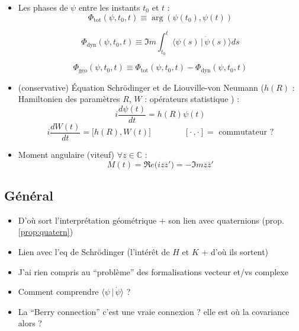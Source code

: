 \documentclass[hidelinks, french, oneside]{article}
\newcommand{\C}{\mathbb{C}}
\newcommand{\phaset}{\Phi_{\text{tot}}}
\newcommand{\phased}{\Phi_{\text{dyn}}}
\newcommand{\phaseg}{\Phi_{\text{geo}}}
\theoremstyle{enonce}
\theoremstyle{special}
\theoremstyle{rqlike}
\theoremstyle{exo}
\theoremstyle{demo}
\begin{document}
\begin{itemize}
	\item Les phases de $\psi$ entre les instants $t_0$ et $t$ :
	\begin{equation}\label{eq:phase_tot}
		\phaset(\psi, t_0, t) \equiv \arg(\psi(t_0), \psi(t))
	\end{equation}
	
	\begin{equation}\label{eq:phase_dyn}
		\phased(\psi,t_0,t) \equiv \Im m \int_{t_0}^t\big\langle \psi(s) \,|\, \dot{\psi}(s) \big\rangle ds
	\end{equation}
	
	\begin{equation}\label{eq:phase_geo}
		\phaseg(\psi, t_0, t) \equiv  \phaset(\psi, t_0, t) - \phased(\psi,t_0,t)
	\end{equation}
	
	\item (conservative) Équation Schrödinger et de Liouville-von Neumann ($h(R)$ : Hamiltonien des paramètres $R$, $W$ : opérateurs statistique ) \cite[p.6]{bohm_geometric_2003} :
	\begin{equation}\label{eq:schrodinger}
		i\frac{d \psi(t)}{dt} = h(R)\psi(t)
	\end{equation}
	\begin{equation}\label{eq:liouville-neumann}
		i\frac{d W(t)}{dt} = \big[h(R),W(t)\big] \qquad\qquad [\cdot\,,\cdot]=\text{ commutateur ?}
	\end{equation}
	
	\item Moment angulaire (viteuf) $\forall z\in\C$ :
	\[M(t) = \Re e \big(iz\overline{z}'\big) = -\Im m z\overline{z}'\]
\end{itemize}


\subsection{Général}

\begin{itemize}
	\item D'où sort l'interprétation géométrique + son lien avec quaternions (prop. \ref{prop:quatern})
	\item Lien avec l'eq de Schrödinger (l'intérêt de $H$ et $K$ + d'où ils sortent)
	\item J'ai rien compris au ``problème'' des formalisations vecteur et/vs complexe
	\item Comment comprendre $\big\langle \psi\, |\, \dot{\psi} \big\rangle$ ?
	
	\item La ``Berry connection'' c'est une vraie connexion ? elle est où la covariance alors ?
\end{itemize}
\end{document}
